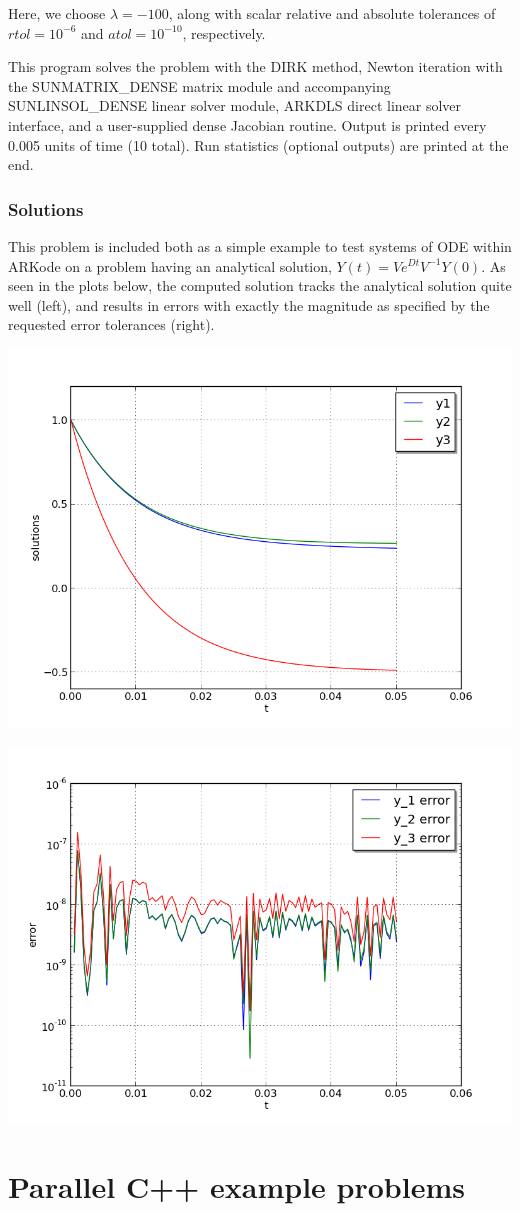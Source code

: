 \documentclass[letterpaper,10pt,english]{sphinxmanual}
\begin{document}
Here, we choose \(\lambda = -100\), along with scalar relative and
absolute tolerances of \(rtol=10^{-6}\) and \(atol=10^{-10}\),
respectively.

This program solves the problem with the DIRK method,
Newton iteration with the SUNMATRIX\_DENSE matrix module and
accompanying SUNLINSOL\_DENSE linear solver module, ARKDLS direct
linear solver interface, and a user-supplied dense Jacobian
routine.  Output is printed every 0.005 units of time (10 total).
Run statistics (optional outputs) are printed at the end.


\subsection{Solutions}
\label{cpp_serial:solutions}
This problem is included both as a simple example to test systems of
ODE within ARKode on a problem having an analytical solution,
\(Y(t) = V e^{Dt} V^{-1} Y(0)\).  As seen in the plots below, the
computed solution tracks the analytical solution quite well (left),
and results in errors with exactly the magnitude as specified by the
requested error tolerances (right).

\includegraphics[width=0.450\linewidth]{plot-ark_analytic_sys.png}

\includegraphics[width=0.450\linewidth]{plot-ark_analytic_sys_error.png}


\chapter{Parallel C++ example problems}
\label{cpp_parallel:parallel-cpp}\label{cpp_parallel::doc}\label{cpp_parallel:parallel-c-example-problems}
\end{document}
